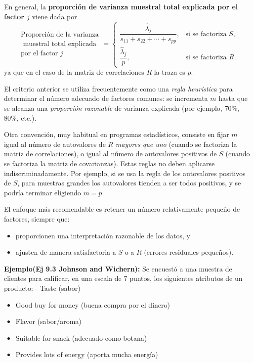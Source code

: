 \documentclass[
]{book}
\begin{document}
En general, la \textbf{proporción de varianza muestral total explicada por el factor \(j\)} viene dada por
\[\begin{array}{c}
\text{Proporción de la varianza} \\
\text{ muestral total explicada} \\
\text{por el factor $j$}
\end{array}
= 
\begin{cases}
\dfrac{\hat{\lambda}_j}{s_{11} + s_{22} + \cdots + s_{pp}},
  & \text{si se factoriza } S, \\[8pt]
\dfrac{\hat{\lambda}_j}{p},
  & \text{si se factoriza } R.
\end{cases}
\]
ya que en el caso de la matriz de correlaciones \(R\) la traza es \(p\).

El criterio anterior se utiliza frecuentemente como una \emph{regla heurística} para determinar el número adecuado de factores comunes: se incrementa \(m\) hasta que se alcanza una \emph{proporción razonable} de varianza explicada (por ejemplo, 70\%, 80\%, etc.).

Otra convención, muy habitual en programas estadísticos, consiste en fijar \(m\) igual al número de autovalores de \(R\) \emph{mayores que uno} (cuando se factoriza la matriz de correlaciones), o igual al número de autovalores positivos de \(S\) (cuando se factoriza la matriz de covarianzas). Estas reglas no deben aplicarse indiscriminadamente. Por ejemplo, si se usa la regla de los autovalores positivos de \(S\), para muestras grandes los autovalores tienden a ser todos positivos, y se podría terminar eligiendo \(m = p\).

El enfoque más recomendable es retener un número relativamente pequeño de factores, siempre que:

\begin{itemize}
\item
  proporcionen una interpretación razonable de los datos, y
\item
  ajusten de manera satisfactoria a \(S\) o a \(R\) (errores residuales pequeños).
\end{itemize}

\textbf{Ejemplo(Ej 9.3 Johnson and Wichern):} Se encuestó a una muestra de clientes para calificar, en una escala de 7 puntos,
los siguientes atributos de un producto:
- Taste (sabor)

\begin{itemize}
\item
  Good buy for money (buena compra por el dinero)
\item
  Flavor (sabor/aroma)
\item
  Suitable for snack (adecuado como botana)
\item
  Provides lots of energy (aporta mucha energía)
\end{itemize}
\end{document}
